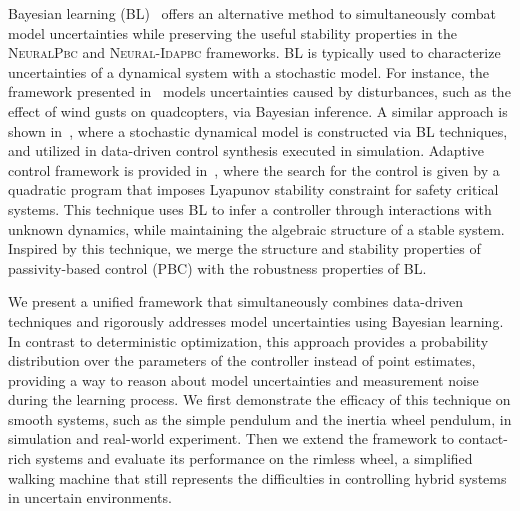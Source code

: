 Bayesian learning (BL)~\cite{gal2016improving,thakur} offers an alternative
method to simultaneously combat model uncertainties while preserving the useful
stability properties in the \textsc{NeuralPbc} and \textsc{Neural-Idapbc} frameworks.
%
BL is typically used to characterize uncertainties of a dynamical system with a
stochastic model.
%
For instance, the framework presented in~\cite{sadigh2015safe} models
uncertainties caused by disturbances, such as the effect of wind gusts on
quadcopters, via Bayesian inference.
%
A similar approach is shown in~\cite{shen2022online, pmlr-v54-linderman17a}, where
a stochastic dynamical model is constructed via BL techniques, and utilized in
data-driven control synthesis executed in simulation. 
%
%
%
Adaptive control framework is provided in~\cite{fan2020bayesian}, where the
search for the control is given by a quadratic program that imposes
Lyapunov stability constraint for safety critical systems.
%
This technique uses BL to infer a controller through interactions with
unknown dynamics, while maintaining the algebraic structure of a stable system.
%
Inspired by this technique, we merge the structure and stability properties of
passivity-based control (PBC) with the robustness properties of BL.  


We present a unified framework that simultaneously combines data-driven
techniques and rigorously addresses model uncertainties using Bayesian learning.
%
%
In contrast to deterministic optimization, this approach provides a probability
distribution over the parameters of the controller instead of point
estimates, providing a way to reason about model uncertainties and measurement
noise during the learning process.
%
We first demonstrate the efficacy of this technique on smooth systems, such as
the simple pendulum and the inertia wheel pendulum, in simulation and real-world
experiment.
%
Then we extend the framework to contact-rich systems and evaluate its
performance on the rimless wheel, a simplified walking machine that still
represents the difficulties in controlling hybrid systems in uncertain
environments.
